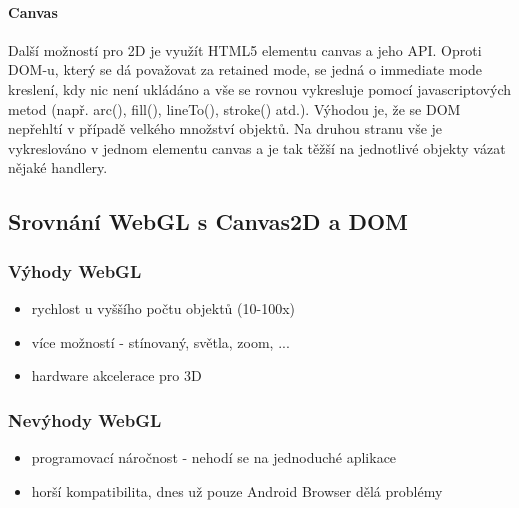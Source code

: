 \documentclass[12pt,a4paper,titlepage,final]{report}
\begin{document}
\paragraph{Canvas} Další možností pro 2D je využít HTML5 elementu canvas a jeho API. Oproti DOM-u, který se dá považovat za retained mode, se jedná o immediate mode kreslení, kdy nic není ukládáno a vše se rovnou vykresluje pomocí javascriptových metod (např. arc(), fill(), lineTo(),  stroke() atd.). Výhodou je, že se DOM nepřehltí v případě velkého množství objektů. Na druhou stranu vše je vykreslováno v jednom elementu canvas a je tak těžší na jednotlivé objekty vázat nějaké handlery.

\subsection{Srovnání WebGL s Canvas2D a DOM}


\subsubsection{Výhody WebGL}
\begin{itemize}
	\item rychlost u vyššího počtu objektů (10-100x)
	\item více možností - stínovaný, světla, zoom, ...	
	\item hardware akcelerace pro 3D
\end{itemize}
\subsubsection{Nevýhody WebGL}
\begin{itemize}
	\item programovací náročnost - nehodí se na jednoduché aplikace
	\item horší kompatibilita, dnes už pouze Android Browser dělá problémy
\end{itemize}
\end{document}
